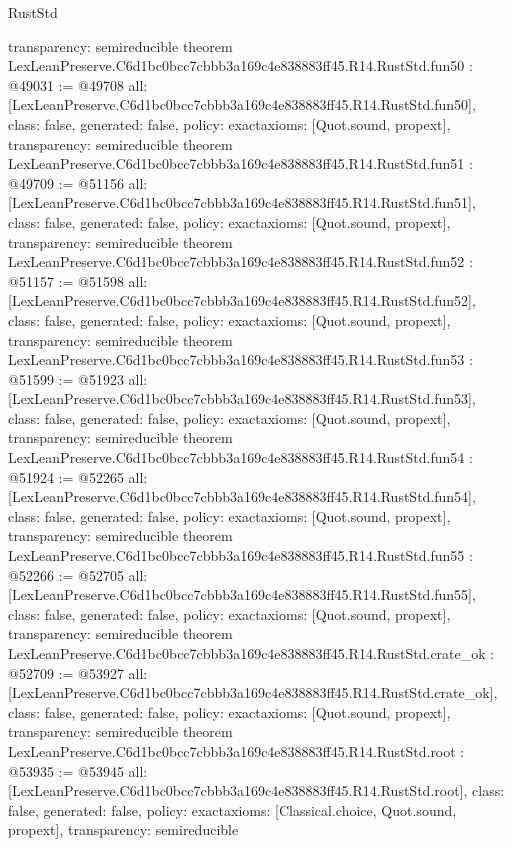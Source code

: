 \begin{lexlean}{RustStd}
\begin{coremodule}
{  transparency: semireducible
}
theorem LexLeanPreserve.C6d1bc0bcc7cbbb3a169c4e838883ff45.R14.RustStd.fun50 : @49031 := @49708 {
  all: [LexLeanPreserve.C6d1bc0bcc7cbbb3a169c4e838883ff45.R14.RustStd.fun50],
  class: false,
  generated: false,
  policy: exact{axioms: [Quot.sound, propext]},
  transparency: semireducible
}
theorem LexLeanPreserve.C6d1bc0bcc7cbbb3a169c4e838883ff45.R14.RustStd.fun51 : @49709 := @51156 {
  all: [LexLeanPreserve.C6d1bc0bcc7cbbb3a169c4e838883ff45.R14.RustStd.fun51],
  class: false,
  generated: false,
  policy: exact{axioms: [Quot.sound, propext]},
  transparency: semireducible
}
theorem LexLeanPreserve.C6d1bc0bcc7cbbb3a169c4e838883ff45.R14.RustStd.fun52 : @51157 := @51598 {
  all: [LexLeanPreserve.C6d1bc0bcc7cbbb3a169c4e838883ff45.R14.RustStd.fun52],
  class: false,
  generated: false,
  policy: exact{axioms: [Quot.sound, propext]},
  transparency: semireducible
}
theorem LexLeanPreserve.C6d1bc0bcc7cbbb3a169c4e838883ff45.R14.RustStd.fun53 : @51599 := @51923 {
  all: [LexLeanPreserve.C6d1bc0bcc7cbbb3a169c4e838883ff45.R14.RustStd.fun53],
  class: false,
  generated: false,
  policy: exact{axioms: [Quot.sound, propext]},
  transparency: semireducible
}
theorem LexLeanPreserve.C6d1bc0bcc7cbbb3a169c4e838883ff45.R14.RustStd.fun54 : @51924 := @52265 {
  all: [LexLeanPreserve.C6d1bc0bcc7cbbb3a169c4e838883ff45.R14.RustStd.fun54],
  class: false,
  generated: false,
  policy: exact{axioms: [Quot.sound, propext]},
  transparency: semireducible
}
theorem LexLeanPreserve.C6d1bc0bcc7cbbb3a169c4e838883ff45.R14.RustStd.fun55 : @52266 := @52705 {
  all: [LexLeanPreserve.C6d1bc0bcc7cbbb3a169c4e838883ff45.R14.RustStd.fun55],
  class: false,
  generated: false,
  policy: exact{axioms: [Quot.sound, propext]},
  transparency: semireducible
}
theorem LexLeanPreserve.C6d1bc0bcc7cbbb3a169c4e838883ff45.R14.RustStd.crate_ok : @52709 := @53927 {
  all: [LexLeanPreserve.C6d1bc0bcc7cbbb3a169c4e838883ff45.R14.RustStd.crate_ok],
  class: false,
  generated: false,
  policy: exact{axioms: [Quot.sound, propext]},
  transparency: semireducible
}
theorem LexLeanPreserve.C6d1bc0bcc7cbbb3a169c4e838883ff45.R14.RustStd.root : @53935 := @53945 {
  all: [LexLeanPreserve.C6d1bc0bcc7cbbb3a169c4e838883ff45.R14.RustStd.root],
  class: false,
  generated: false,
  policy: exact{axioms: [Classical.choice, Quot.sound, propext]},
  transparency: semireducible
}


\end{coremodule}
\end{lexlean}
